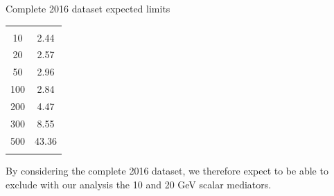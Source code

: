 \documentclass[8 pt]{beamer}
\newcommand{\backupend}{
   \setcounter{framenumber}{\value{finalframe}}
}
\begin{document}
\begin{frame}{Complete 2016 dataset expected limits}
\begin{center}
\begin{minipage}[c]{.48\linewidth}
\begin{center}
\begin{tabular}{c|c}
		\hline \hline
		& \\
		10 & 2.44 \\
            	20 & 2.57  \\
            	50 & 2.96  \\
            	100 & 2.84 \\
            	200 & 4.47 \\
            	300 & 8.55 \\
            	500 & 43.36 \\
		& \\
          \end{tabular}
          \end{center}
   \end{minipage} \hfill \vfill
   \end{center}
   
   By considering the complete 2016 dataset, we therefore expect to be able to exclude with our analysis the 10 and 20 GeV scalar mediators. \vfill

\end{frame}





\backupend


 
\end{document}
